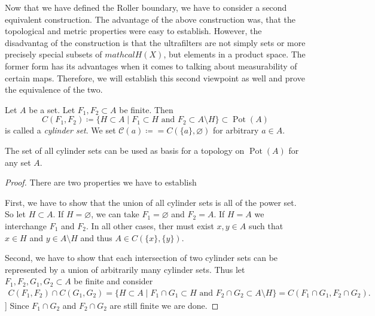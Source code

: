 Now that we have defined the Roller boundary, we have to consider a second equivalent construction. The advantage of the above construction was, that the topological and metric properties were easy to establish. However, the disadvantag of the construction is that the ultrafilters are not simply sets or more precisely special subsets of \(mathcal{H}(X)\), but elements in a product space. The former form has its advantages when it comes to talking about measurability of certain maps. Therefore, we will establish this second viewpoint as well and prove the equivalence of the two.

\begin{defin}
  \label{def:pot-top}
  Let \(A\) be a set. Let \(F_1, F_2 \subset A\) be finite. Then
  \[
    C(F_1, F_2) \coloneqq \{ H \subset A \mid F_1 \subset H \text{ and } F_2 \subset A \setminus H\} \subset \operatorname{Pot}(A)
  \]
  is called a \emph{cylinder set}. We set \(\mathcal{C}(a) \coloneqq = C(\{a\}, \varnothing)\) for arbitrary \(a \in A\).
\end{defin}

\begin{prop}
  \label{prop:pot-top}
  The set of all cylinder sets can be used as basis for a topology on \(\operatorname{Pot}(A)\) for any set \(A\).
\end{prop}

\begin{proof}
  There are two properties we have to establish
  
  First, we have to show that the union of all cylinder sets is all of the power set. So let \(H \subset A\). If \(H = \varnothing\), we can take \(F_1 = \varnothing\) and \(F_2 = A\). If \(H = A\) we interchange \(F_1\) and \(F_2\). In all other cases, ther must exist \(x,y \in A\) such that \(x \in H\) and \(y \in A \setminus H\) and thus \(A \in C(\{x\}, \{y\})\).

  Second, we have to show that each intersection of two cylinder sets can be represented by a union of arbitrarily many cylinder sets. Thus let \(F_1, F_2, G_1, G_2 \subset A\) be finite and consider
  \begin{align*}
    C(F_1, F_2) \cap C(G_1, G_2)
     = \{H \subset A \mid F_1 \cap G_1 \subset H \text{ and } F_2 \cap G_2 \subset A \setminus H\} = C(F_1 \cap G_1, F_2 \cap G_2).
  \end{align*}]
  Since \(F_1 \cap G_2\) and \(F_2 \cap G_2\) are still finite we are done.
\end{proof}

